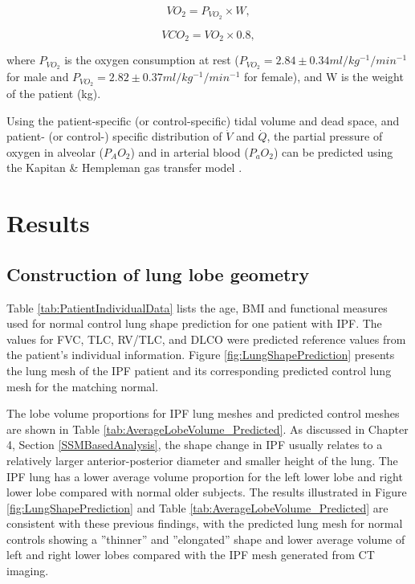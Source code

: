 \begin{equation} 
 \label{eq:O2ConsumptionEstimation}
 VO_2 = P_{VO_2} \times W,
\end{equation}

\begin{equation} 
 \label{eq:CO2ConsumptionEstimation}
 VCO_2 = VO_2 \times 0.8,
\end{equation}

\noindent where $P_{VO_2}$ is the oxygen consumption at rest ($P_{VO_2} = 2.84 \pm 0.34 ml/kg^{-1}/min^{-1}$ for male and $P_{VO_2} = 2.82 \pm 0.37 ml/kg^{-1}/min^{-1}$ for female), and W is the weight of the patient (kg).

Using the patient-specific (or control-specific) tidal volume and dead space, and patient- (or control-) specific distribution of $\dot{V}$ and $\dot{Q}$, the partial pressure of oxygen in alveolar ($P_AO_2$) and in arterial blood ($P_aO_2$) can be predicted using the Kapitan \& Hempleman gas transfer model \citep{kapitan1986computer}.

\section{Results}
\subsection{Construction of lung lobe geometry}
Table \ref{tab:PatientIndividualData} lists the age, BMI and functional measures used for normal control lung shape prediction for one patient with IPF. The values for FVC, TLC, RV/TLC, and DLCO were predicted reference values from the patient's individual information. Figure \ref{fig:LungShapePrediction} presents the lung mesh of the IPF patient and its corresponding predicted control lung mesh for the matching normal. 

The lobe volume proportions for IPF lung meshes and predicted control meshes are shown in Table \ref{tab:AverageLobeVolume_Predicted}. As discussed in Chapter 4, Section \ref{SSMBasedAnalysis}, the shape change in IPF usually relates to a relatively larger anterior-posterior diameter and smaller height of the lung. The IPF lung has a lower average volume proportion for the left lower lobe and right lower lobe compared with normal older subjects. The results illustrated in Figure \ref{fig:LungShapePrediction} and Table \ref{tab:AverageLobeVolume_Predicted} are consistent with these previous findings, with the predicted lung mesh for normal controls showing a ''thinner'' and ''elongated'' shape and lower average volume of left and right lower lobes compared with the IPF mesh generated from CT imaging.


